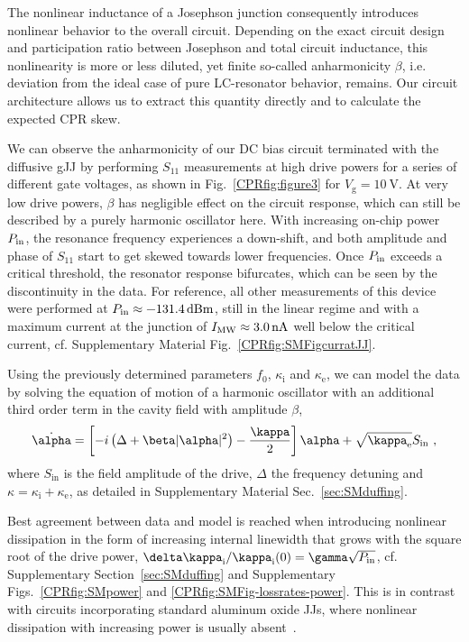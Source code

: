 The nonlinear inductance of a Josephson junction consequently introduces nonlinear behavior to the overall circuit.
%
Depending on the exact circuit design and participation ratio between Josephson and total circuit inductance, this nonlinearity is more or less diluted, yet finite so-called anharmonicity $\beta$, i.e. deviation from the ideal case of pure LC-resonator behavior, remains.
%
Our circuit architecture allows us to extract this quantity directly and to calculate the expected CPR skew.

We can observe the anharmonicity of our DC bias circuit terminated with the diffusive gJJ by performing $S_{11}$ measurements at high drive powers for a series of different gate voltages, as shown in Fig.~\ref{CPRfig:figure3} for $V_\text{g}=\SI{+10}{\volt}$.
%
At very low drive powers, $\beta$ has negligible effect on the circuit response, which can still be described by a purely harmonic oscillator here.
%
With increasing on-chip power $P_{\rm in}$, the resonance frequency experiences a down-shift, and both amplitude and phase of $S_{11}$ start to get skewed towards lower frequencies.
%
Once $P_{\rm in}$ exceeds a critical threshold, the resonator response bifurcates, which can be seen by the discontinuity in the data.
%
For reference, all other measurements of this device were performed at $P_{\rm in}\approx\SI{-131.4}{dBm}$, still in the linear regime and with a maximum current at the junction of $I_{\rm MW}\approx\SI{3.0}{\nano\ampere}$ well below the critical current, cf. Supplementary Material Fig.~\ref{CPRfig:SMFigcurratJJ}.

Using the previously determined parameters $f_0$, $\kappa_\text{i}$ and $\kappa_\text{e}$, we can model the data by solving the equation of motion of a harmonic oscillator with an additional third order term in the cavity field with amplitude $\beta$, 
%
\begin{align}
\dot{\alpha} = \left[ -i \left( \Delta+\beta\abs{\alpha}^2 \right)-\frac{\kappa}{2} \right]\alpha + \sqrt{\kappa_\text{e}} S_\text{in}\ ,
\label{CPReq:Duffing-EOM}
\end{align}
%
where $S_\text{in}$ is the field amplitude of the drive, $\Delta$ the frequency detuning and $\kappa=\kappa_\text{i}+\kappa_\text{e}$, as detailed in Supplementary Material Sec.~\ref{sec:SMduffing}.


Best agreement between data and model is reached when introducing nonlinear dissipation in the form of increasing internal linewidth that grows with the square root of the drive power, $\delta\kappa_\text{i}/\kappa_\text{i}(0)=\gamma \sqrt{P_{\rm in}}$, cf. Supplementary Section~\ref{sec:SMduffing} and Supplementary Figs.~\ref{CPRfig:SMpower} and \ref{CPRfig:SMFig-lossrates-power}.
%
This is in contrast with circuits incorporating standard aluminum oxide JJs, where nonlinear dissipation with increasing power is usually absent~\cite{boakninDispersiveMicrowaveBifurcation2007b}.

